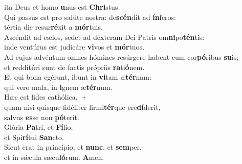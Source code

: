 \oddverse ita Deus et homo \textbf{u}nus est \textbf{Chri}stus.\\
\evenverse Qui passus est pro salúte nostra: de\textbf{scén}dit ad \textbf{ín}feros:~\*\\
\evenverse tértia die resur\textbf{ré}xit a \textbf{mór}tuis.\\
\oddverse Ascéndit ad cælos, sedet ad déxteram Dei Patris om\textbf{ni}po\textbf{tén}tis:~\*\\
\oddverse inde ventúrus est judicáre \textbf{vi}vos et \textbf{mór}tuos.\\
\evenverse Ad cujus advéntum omnes hómines resúrgere habent cum cor\textbf{pó}ribus \textbf{su}is;~\*\\
\evenverse et redditúri sunt de factis própriis \textbf{ra}ti\textbf{ó}nem.\\
\oddverse Et qui bona egérunt, ibunt in \textbf{vi}tam æ\textbf{tér}nam:~\*\\
\oddverse qui vero mala, in \textbf{i}gnem æ\textbf{tér}num.\\
\evenverse Hæc est fides cathólica,~+\\
\evenverse  quam nisi quisque fidéliter firmi\textbf{tér}que cre\textbf{dí}derit,~\*\\
\evenverse salvus \textbf{es}se non \textbf{pó}terit.\\
\oddverse Glória \textbf{Pa}tri, et \textbf{Fí}lio,~\*\\
\oddverse et Spi\textbf{rí}tui \textbf{San}cto.\\
\evenverse Sicut erat in princípio, et \textbf{nunc}, et \textbf{sem}per,~\*\\
\evenverse et in sǽcula sæcu\textbf{ló}rum. \textbf{A}men.\\

